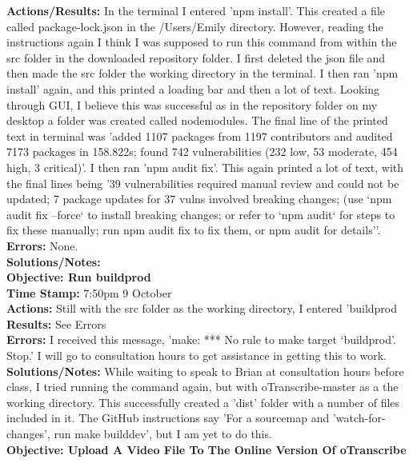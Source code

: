 \documentclass{article}
\begin{document}
\begin{FlushLeft}
\textbf{Actions/Results:} In the terminal I entered 'npm install'. This created a file called package-lock.json in the /Users/Emily directory. However, reading the instructions again I think I was supposed to run this command from within the src folder in the downloaded repository folder. I first deleted the json file and then made the src folder the working directory in the terminal. I then ran 'npm install' again, and this printed a loading bar and then a lot of text. Looking through GUI, I believe this was successful as in the repository folder on my desktop a folder was created called node\textunderscore modules. The final line of the printed text in terminal was 'added 1107 packages from 1197 contributors and audited 7173 packages in 158.822s; found 742 vulnerabilities (232 low, 53 moderate, 454 high, 3 critical)'. I then ran 'npm audit fix'. This again printed a lot of text, with the final lines being '39 vulnerabilities required manual review and could not be updated; 7 package updates for 37 vulns involved breaking changes; (use `npm audit fix --force` to install breaking changes; or refer to `npm audit` for steps to fix these manually; run npm audit fix to fix them, or npm audit for details''. \\
\textbf{Errors:} None.\\
\textbf{Solutions/Notes:}\\
\vspace{5mm}
\textbf{Objective: Run build\textunderscore prod}\\ 
\textbf{Time Stamp:} 7:50pm 9 October\\
\textbf{Actions:} Still with the src folder as the working directory, I entered 'build\textunderscore prod \\
\textbf{Results:} See Errors\\
\textbf{Errors:} I received this message, 'make: *** No rule to make target `build\textunderscore prod'.  Stop.' I will go to consultation hours to get assistance in getting this to work.\\
\textbf{Solutions/Notes:} While waiting to speak to Brian at consultation hours before class, I tried running the command again, but with oTranscribe-master as a the working directory. This successfully created a 'dist' folder with a number of files included in it. The GitHub instructions say 'For a sourcemap and 'watch-for-changes', run make build\textunderscore dev', but I am yet to do this.\\
\vspace{5mm}
\textbf{Objective: Upload A Video File To The Online Version Of oTranscribe}\\ 

\end{FlushLeft}
\end{document}
